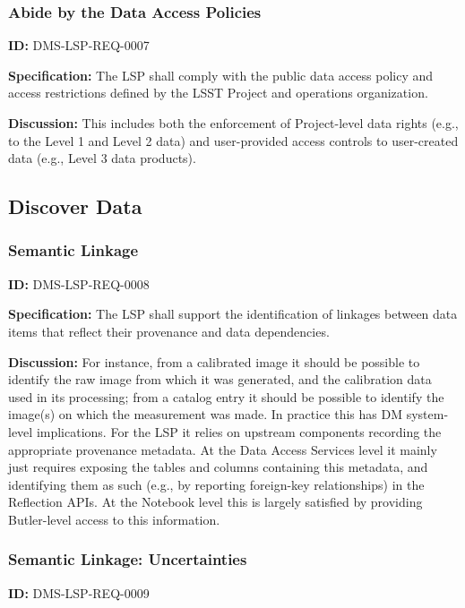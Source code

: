 \documentclass[SE,toc,lsstdraft]{lsstdoc}
\begin{document}
\subsubsection{Abide by the Data Access Policies}

\label{DMS-LSP-REQ-0007}
\textbf{ID:} DMS-LSP-REQ-0007

\textbf{Specification:}
The LSP shall comply with the public data access policy and access restrictions defined by the LSST Project and operations organization.

\textbf{Discussion:}
This includes both the enforcement of Project-level data rights (e.g., to the Level 1 and Level 2 data) and user-provided access controls to user-created data (e.g., Level 3 data products).

\subsection{Discover Data}

\subsubsection{Semantic Linkage}

\label{DMS-LSP-REQ-0008}
\textbf{ID:} DMS-LSP-REQ-0008

\textbf{Specification:}
The LSP shall support the identification of linkages between data items that reflect their provenance and data dependencies.

\textbf{Discussion:}
For instance, from a calibrated image it should be possible to identify the raw image from which it was generated, and the calibration data used in its processing; from a catalog entry it should be possible to identify the image(s) on which the measurement was made.
In practice this has DM system-level implications.  For the LSP it relies on upstream components recording the appropriate provenance metadata.  At the Data Access Services level it mainly just requires exposing the tables and columns containing this metadata, and identifying them as such (e.g., by reporting foreign-key relationships) in the Reflection APIs.  At the Notebook level this is largely satisfied by providing Butler-level access to this information.

\subsubsection{Semantic Linkage: Uncertainties}

\label{DMS-LSP-REQ-0009}
\textbf{ID:} DMS-LSP-REQ-0009
\end{document}
